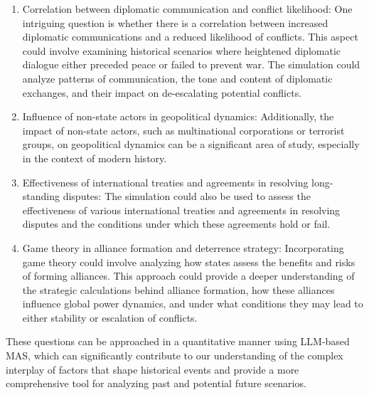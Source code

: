 \documentclass{article}
\begin{document}
\begin{enumerate}
    \item Correlation between diplomatic communication and conflict likelihood: One intriguing question is whether there is a correlation between increased diplomatic communications and a reduced likelihood of conflicts. This aspect could involve examining historical scenarios where heightened diplomatic dialogue either preceded peace or failed to prevent war. The simulation could analyze patterns of communication, the tone and content of diplomatic exchanges, and their impact on de-escalating potential conflicts.
    \item Influence of non-state actors in geopolitical dynamics: Additionally, the impact of non-state actors, such as multinational corporations or terrorist groups, on geopolitical dynamics can be a significant area of study, especially in the context of modern history.
    \item Effectiveness of international treaties and agreements in resolving long-standing disputes: The simulation could also be used to assess the effectiveness of various international treaties and agreements in resolving disputes and the conditions under which these agreements hold or fail.
    \item Game theory in alliance formation and deterrence strategy: Incorporating game theory could involve analyzing how states assess the benefits and risks of forming alliances. This approach could provide a deeper understanding of the strategic calculations behind alliance formation, how these alliances influence global power dynamics, and under what conditions they may lead to either stability or escalation of conflicts.

\end{enumerate}

These questions can be approached in a quantitative manner using LLM-based MAS, which can significantly contribute to our understanding of the complex interplay of factors that shape historical events and provide a more comprehensive tool for analyzing past and potential future scenarios.

\end{document}
